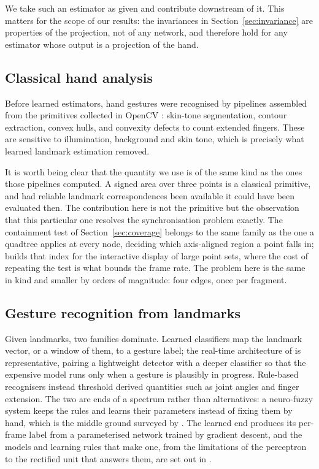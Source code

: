 \documentclass{article}
\theoremstyle{definition}
\begin{document}
We take such an estimator as given and contribute downstream of it. This matters
for the scope of our results: the invariances in Section~\ref{sec:invariance}
are properties of the projection, not of any network, and therefore hold for any
estimator whose output is a projection of the hand.

\subsection{Classical hand analysis}

Before learned estimators, hand gestures were recognised by pipelines assembled
from the primitives collected in OpenCV \citep{bradski2000opencv}: skin-tone
segmentation, contour extraction, convex hulls, and convexity defects to count
extended fingers. These are sensitive to illumination, background and skin tone,
which is precisely what learned landmark estimation removed.

It is worth being clear that the quantity we use is of the same kind as the ones
those pipelines computed. A signed area over three points is a classical
primitive, and had reliable landmark correspondences been available it could
have been evaluated then. The contribution here is not the primitive but the
observation that this particular one resolves the synchronisation problem
exactly. The containment test of Section~\ref{sec:coverage} belongs to the same
family as the one a quadtree applies at every node, deciding which axis-aligned
region a point falls in; \citet{thakur2022quadtree} builds that index for the
interactive display of large point sets, where the cost of repeating the test is
what bounds the frame rate. The problem here is the same in kind and smaller by
orders of magnitude: four edges, once per fragment.

\subsection{Gesture recognition from landmarks}

Given landmarks, two families dominate. Learned classifiers map the landmark
vector, or a window of them, to a gesture label; the real-time architecture of
\citet{kopuklu2019realtime} is representative, pairing a lightweight detector
with a deeper classifier so that the expensive model runs only when a gesture is
plausibly in progress. Rule-based recognisers instead threshold derived
quantities such as joint angles and finger extension.
The two are ends of a spectrum rather than alternatives: a neuro-fuzzy system
keeps the rules and learns their parameters instead of fixing them by hand, which
is the middle ground surveyed by \citet{thakur2021neurofuzzy}. The learned end
produces its per-frame label from a parameterised network trained by gradient
descent, and the models and learning rules that make one, from the limitations of
the perceptron to the rectified unit that answers them, are set out in
\citet{thakur2021neuralnetworks}.
\end{document}
